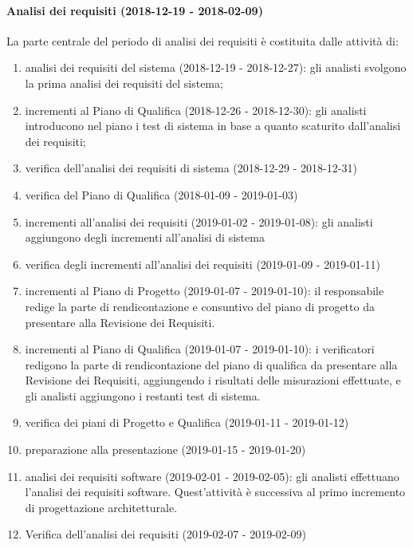 		\paragraph{Analisi dei requisiti (2018-12-19 - 2018-02-09)\\} La parte centrale del periodo di analisi dei requisiti è costituita dalle attività di:
			\begin{enumerate}[label = 2.2.\arabic*)]
				\item analisi dei requisiti del sistema (2018-12-19 - 2018-12-27): gli analisti svolgono la prima analisi dei requisiti del sistema;
				\item incrementi al Piano di Qualifica (2018-12-26 - 2018-12-30): gli analisti introducono nel piano i test di sistema in base a quanto scaturito dall'analisi dei requisiti;
				\item verifica dell'analisi dei requisiti di sistema (2018-12-29 - 2018-12-31)
				\item verifica del Piano di Qualifica (2018-01-09 - 2019-01-03)
				\item incrementi all'analisi dei requisiti (2019-01-02 - 2019-01-08): gli analisti aggiungono degli incrementi all'analisi di sistema
				\item verifica degli incrementi all'analisi dei requisiti (2019-01-09 - 2019-01-11)
				\item incrementi al Piano di Progetto (2019-01-07 - 2019-01-10): il responsabile redige la parte di rendicontazione e consuntivo del piano di progetto da presentare alla Revisione dei Requisiti.
				\item incrementi al Piano di Qualifica (2019-01-07 - 2019-01-10): i verificatori redigono la parte di rendicontazione del piano di qualifica da presentare alla Revisione dei Requisiti, aggiungendo i risultati delle misurazioni effettuate, e gli analisti aggiungono i restanti test di sistema.
				\item verifica dei piani di Progetto e Qualifica (2019-01-11 - 2019-01-12)
				\item preparazione alla presentazione (2019-01-15 - 2019-01-20)
				\item analisi dei requisiti software (2019-02-01 - 2019-02-05): gli analisti effettuano l'analisi dei requisiti software. Quest'attività è successiva al primo incremento di progettazione architetturale.
				\item Verifica dell'analisi dei requisiti (2019-02-07 - 2019-02-09)				
			\end{enumerate}

